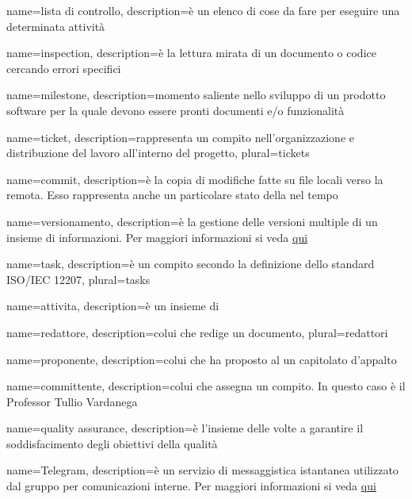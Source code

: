  {
	name=lista di controllo,
	description={è un elenco di cose da fare per eseguire una determinata attività}
}

 {
	name=inspection,
	description={è la lettura mirata di un documento o codice cercando errori specifici}
}

 {
	name=milestone,
	description={momento saliente nello sviluppo di un prodotto software per la quale devono essere pronti documenti e/o funzionalità}
}

 {
	name=ticket,
	description={rappresenta un compito nell'organizzazione e distribuzione del lavoro all'interno del progetto},
	plural=tickets
}

 {
	name=commit,
	description={è la copia di modifiche fatte su file locali verso la  remota. Esso rappresenta anche un particolare stato della  nel tempo}
}

 {
	name=versionamento,
	description={è la gestione delle versioni multiple di un insieme di informazioni. Per maggiori informazioni si veda \href{http://it. wikipedia.org/wiki/Controllo_versione}{qui}}
}

 {
	name=task,
	description={è un compito secondo la definizione dello standard ISO/IEC 12207},
	plural=tasks
}

 {
	name=attivita,
	description={è un insieme di }
}

 {
	name=redattore,
	description={colui che redige un documento},
	plural=redattori
}

 {
	name=proponente,
	description={colui che ha proposto al  un capitolato d'appalto}
}

 {
	name=committente,
	description={colui che assegna un compito. In questo caso è il Professor Tullio Vardanega}
}

 {
	name=quality assurance,
	description={è l'insieme delle  volte a garantire il soddisfacimento degli obiettivi della qualità}
}

 {
	name=Telegram,
	description={è un servizio di messaggistica istantanea utilizzato dal gruppo per comunicazioni interne. Per maggiori informazioni si veda \href{https://it.wikipedia.org/wiki/Telegram_(software)}{qui}}
}


